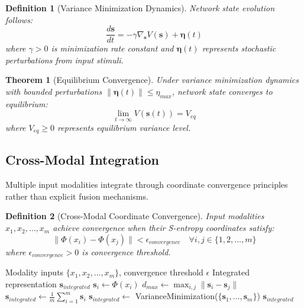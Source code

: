 \documentclass[12pt,a4paper]{article}
\newtheorem{theorem}{Theorem}
\newtheorem{definition}{Definition}
\begin{document}
\begin{definition}[Variance Minimization Dynamics]
Network state evolution follows:
\begin{equation}
\frac{d\mathbf{s}}{dt} = -\gamma \nabla_{\mathbf{s}} V(\mathbf{s}) + \boldsymbol{\eta}(t)
\end{equation}
where $\gamma > 0$ is minimization rate constant and $\boldsymbol{\eta}(t)$ represents stochastic perturbations from input stimuli.
\end{definition}

\begin{theorem}[Equilibrium Convergence]
Under variance minimization dynamics with bounded perturbations $\|\boldsymbol{\eta}(t)\| \leq \eta_{max}$, network state converges to equilibrium:
\begin{equation}
\lim_{t \to \infty} V(\mathbf{s}(t)) = V_{eq}
\end{equation}
where $V_{eq} \geq 0$ represents equilibrium variance level.
\end{theorem}

\subsection{Cross-Modal Integration}

Multiple input modalities integrate through coordinate convergence principles rather than explicit fusion mechanisms.

\begin{definition}[Cross-Modal Coordinate Convergence]
Input modalities $x_1, x_2, \ldots, x_m$ achieve convergence when their S-entropy coordinates satisfy:
\begin{equation}
\|\Phi(x_i) - \Phi(x_j)\| < \epsilon_{convergence} \quad \forall i,j \in \{1,2,\ldots,m\}
\end{equation}
where $\epsilon_{convergence} > 0$ is convergence threshold.
\end{definition}

\begin{algorithm}[H]
\caption{Cross-Modal Integration}
\begin{algorithmic}[1]
\REQUIRE Modality inputs $\{x_1, x_2, \ldots, x_m\}$, convergence threshold $\epsilon$
\ENSURE Integrated representation $\mathbf{s}_{integrated}$
    \STATE $\mathbf{s}_i \leftarrow \Phi(x_i)$ 
\ENDFOR
\STATE $d_{max} \leftarrow \max_{i,j} \|\mathbf{s}_i - \mathbf{s}_j\|$
    \STATE $\mathbf{s}_{integrated} \leftarrow \frac{1}{m}\sum_{i=1}^m \mathbf{s}_i$ 
\ELSE
    \STATE $\mathbf{s}_{integrated} \leftarrow$ VarianceMinimization($\{\mathbf{s}_1, \ldots, \mathbf{s}_m\}$)
\ENDIF
\RETURN $\mathbf{s}_{integrated}$
\end{algorithmic}
\end{algorithm}
\end{document}
